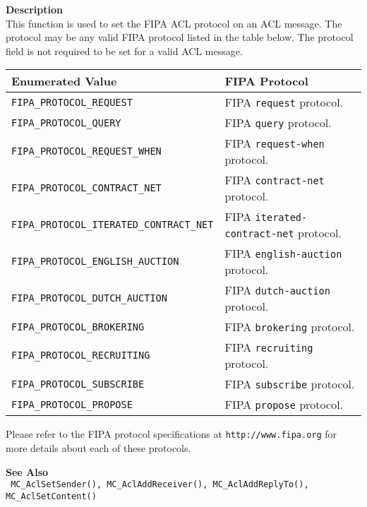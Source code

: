 \noindent
{\bf Description}\\
This function is used to set the FIPA ACL protocol on an ACL message. 
The protocol may be any valid FIPA protocol listed in the table 
below. The protocol field is not required to be set for a valid ACL
message. \\
\begin{tabular}{ll}
Enumerated Value & FIPA Protocol \\ \hline
\texttt{FIPA\_PROTOCOL\_REQUEST} & FIPA \texttt{request} protocol. \\
\texttt{FIPA\_PROTOCOL\_QUERY} & FIPA \texttt{query} protocol. \\
\texttt{FIPA\_PROTOCOL\_REQUEST\_WHEN} & FIPA \texttt{request-when} protocol. \\
\texttt{FIPA\_PROTOCOL\_CONTRACT\_NET} & FIPA \texttt{contract-net} protocol. \\
\texttt{FIPA\_PROTOCOL\_ITERATED\_CONTRACT\_NET} & FIPA \texttt{iterated-contract-net} protocol. \\
\texttt{FIPA\_PROTOCOL\_ENGLISH\_AUCTION} & FIPA \texttt{english-auction} protocol.\\
\texttt{FIPA\_PROTOCOL\_DUTCH\_AUCTION} & FIPA \texttt{dutch-auction} protocol. \\
\texttt{FIPA\_PROTOCOL\_BROKERING} & FIPA \texttt{brokering} protocol. \\
\texttt{FIPA\_PROTOCOL\_RECRUITING} & FIPA \texttt{recruiting} protocol. \\
\texttt{FIPA\_PROTOCOL\_SUBSCRIBE} & FIPA \texttt{subscribe} protocol. \\
\texttt{FIPA\_PROTOCOL\_PROPOSE} & FIPA \texttt{propose} protocol. \\
\end{tabular}
Please refer to the FIPA protocol specifications at \texttt{http://www.fipa.org} for 
more details about each of these protocols.


\noindent
{\bf See Also}\\
\texttt{
  MC\_AclSetSender(), MC\_AclAddReceiver(), MC\_AclAddReplyTo(), \linebreak 
    MC\_AclSetContent()
}

